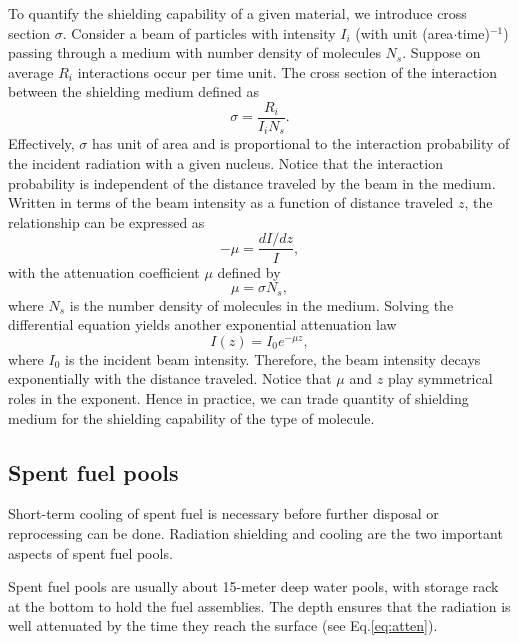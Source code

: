 \documentclass[nofootinbib,preprint,aps]{revtex4-1}
\begin{document}
    To quantify the shielding capability of a given material, we introduce cross section $\sigma$. Consider
    a beam of particles with intensity $I_i$ (with unit (area$\cdot$time)${}^{-1}$) passing through a medium
    with number density of molecules $N_s$. Suppose on average $R_i$ interactions occur per time unit.
    The cross section of the interaction between the shielding medium defined as
    \begin{equation}
        \sigma = \frac{R_i}{I_i N_s}.
    \end{equation}
    Effectively, $\sigma$ has unit of area and
    is proportional to the interaction probability of the incident radiation with a given nucleus.\cite{k88}
    Notice that the interaction probability is independent of the distance traveled by the beam in
    the medium. Written in terms of the beam intensity as a function of distance traveled $z$,
    the relationship can be expressed as
    \begin{equation}
        -\mu = \frac{d I/dz}{I},
    \end{equation}
    with the attenuation coefficient $\mu$ defined by
    \begin{equation}
        \mu = \sigma N_s,
    \end{equation}
    where $N_s$ is the number density of molecules in the medium.
    Solving the differential
    equation yields another exponential attenuation law
    \begin{equation}
        \label{eq:atten}
        I(z) = I_0 e^{-\mu z},
    \end{equation}
    where $I_0$ is the incident beam intensity. Therefore, the beam intensity decays exponentially
    with the distance traveled. Notice that $\mu$ and $z$ play symmetrical roles in the exponent. Hence
    in practice, we can trade quantity of shielding medium for the shielding capability of the type of
    molecule.

    \subsection{Spent fuel pools}
    Short-term cooling of spent fuel is necessary before further disposal or reprocessing can be done.
    Radiation shielding and cooling are the two important aspects of spent fuel pools.

    Spent fuel pools  are usually about 15-meter deep water pools,
    with storage rack at the bottom to hold the fuel assemblies. The depth ensures that the radiation
    is well attenuated by the time they reach the surface (see Eq.\ref{eq:atten}).
\end{document}

